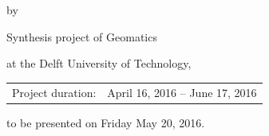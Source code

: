 \begin{titlepage}


\begin{center}


{\makeatletter
\largetitlestyle\fontsize{64}{94}\selectfont\@title
\makeatother}

{\makeatletter
\ifx\@subtitle\undefined\else
    \bigskip
   {\tudsffamily\fontsize{22}{32}\selectfont\@subtitle}    
\fi
\makeatother}

\bigskip
\bigskip

by

\bigskip
\bigskip

{\makeatletter
\largetitlestyle\fontsize{26}{26}\selectfont\@author
\makeatother}

\bigskip
\bigskip

{\fontsize{15}{0.2}\selectfont Synthesis project of Geomatics

at the Delft University of Technology,}

\vfill

\begin{tabular}{lll}
    Project duration: & \multicolumn{2}{l}{April 16, 2016 -- June 17, 2016} \\
\end{tabular}

\bigskip
\bigskip
\bigskip
\bigskip
to be presented on Friday May 20, 2016.
\end{center}


\end{titlepage}

